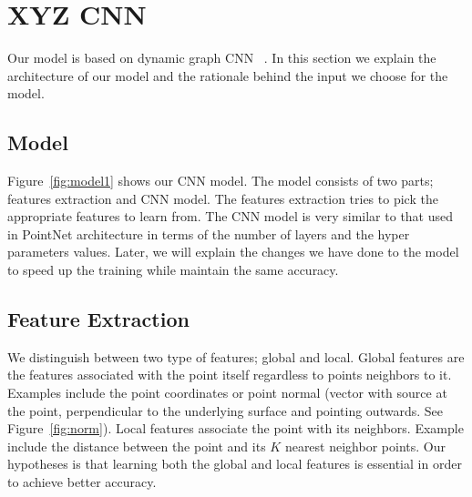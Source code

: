 \section{XYZ CNN}



Our model is based on dynamic graph CNN ~\citep{wang2018dynamic}. In this section we explain the architecture of our model and the rationale behind the input we choose for the model.
\subsection{Model}
Figure~\ref{fig:model1} shows our CNN model. The model consists of two parts; features extraction and CNN model. The features extraction tries to pick the appropriate features to learn from. The CNN model is very similar to that used in PointNet architecture in terms of the number of layers and the hyper parameters values. Later, we will explain the changes we have done to the model to speed up the training while maintain the same accuracy. 
\subsection{Feature Extraction} 
We distinguish between two type of features; global and local. Global features are the features associated with the point itself regardless to points neighbors to it. Examples include the point coordinates or point normal (vector with source at the point, perpendicular to the underlying surface and pointing outwards. See Figure~\ref{fig:norm}). Local features associate the point with its neighbors. Example include the distance between the point and its $K$ nearest neighbor points. Our hypotheses  is that learning both the global and local features is essential in order to achieve better accuracy. 



